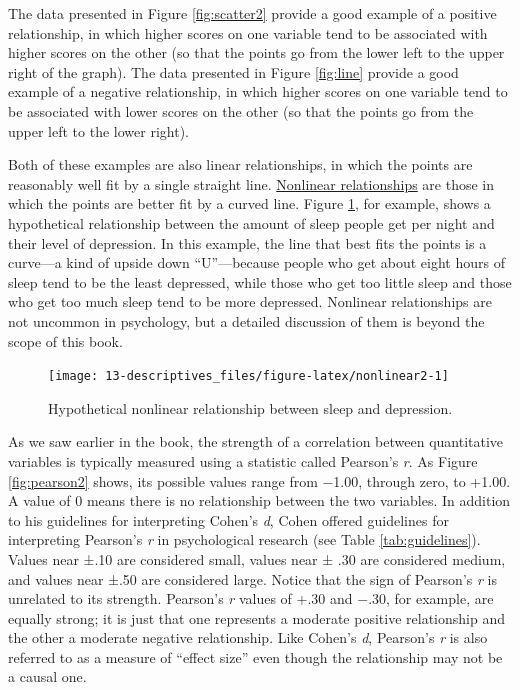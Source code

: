\documentclass[
]{krantz}
\begin{document}
The data presented in Figure \ref{fig:scatter2} provide a good example of a positive relationship, in which higher scores on one variable tend to be associated with higher scores on the other (so that the points go from the lower left to the upper right of the graph). The data presented in Figure \ref{fig:line} provide a good example of a negative relationship, in which higher scores on one variable tend to be associated with lower scores on the other (so that the points go from the upper left to the lower right).

Both of these examples are also linear relationships, in which the points are reasonably well fit by a single straight line. \protect\hyperlink{nonlinear-relationship}{Nonlinear relationships} are those in which the points are better fit by a curved line. Figure \ref{fig:nonlinear2}, for example, shows a hypothetical relationship between the amount of sleep people get per night and their level of depression. In this example, the line that best fits the points is a curve---a kind of upside down ``U''---because people who get about eight hours of sleep tend to be the least depressed, while those who get too little sleep and those who get too much sleep tend to be more depressed. Nonlinear relationships are not uncommon in psychology, but a detailed discussion of them is beyond the scope of this book.

\begin{figure}

{\centering \texttt{[image: 13-descriptives\_files/figure-latex/nonlinear2-1]} 

}

\caption{Hypothetical nonlinear relationship between sleep and depression.}\label{fig:nonlinear2}
\end{figure}

As we saw earlier in the book, the strength of a correlation between quantitative variables is typically measured using a statistic called Pearson's \emph{r}. As Figure \ref{fig:pearson2} shows, its possible values range from −1.00, through zero, to +1.00. A value of 0 means there is no relationship between the two variables. In addition to his guidelines for interpreting Cohen's \emph{d}, Cohen offered guidelines for interpreting Pearson's \emph{r} in psychological research (see Table \ref{tab:guidelines}). Values near ±.10 are considered small, values near ± .30 are considered medium, and values near ±.50 are considered large. Notice that the sign of Pearson's \emph{r} is unrelated to its strength. Pearson's \emph{r} values of +.30 and −.30, for example, are equally strong; it is just that one represents a moderate positive relationship and the other a moderate negative relationship. Like Cohen's \emph{d}, Pearson's \emph{r} is also referred to as a measure of ``effect size'' even though the relationship may not be a causal one.
\end{document}
